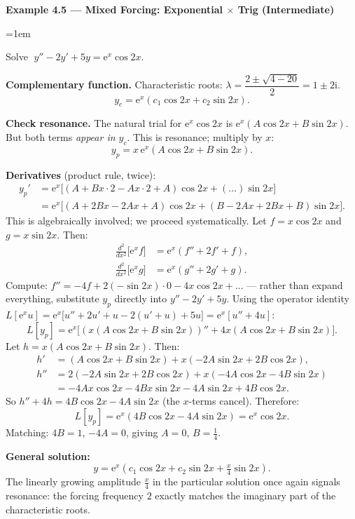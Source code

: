 \documentclass[12pt,a4paper]{article}
\newenvironment{example}[1]{%
  \vspace{0.8em}
  \noindent{\footnotesize\scshape\color{orange!50!black} Example}\par
  \noindent\textbf{#1}\par\vspace{0.3em}
  \begin{list}{}{\leftmargin=1em\rightmargin=0pt}\item
}{%
  \end{list}\vspace{0.8em}
}
\newcommand{\ee}{\mathrm{e}}
\newcommand{\ii}{\mathrm{i}}
\begin{document}
\begin{example}{Example 4.5 --- Mixed Forcing: Exponential $\times$ Trig (Intermediate)}
Solve $\;y'' - 2y' + 5y = \ee^x\cos 2x$.

\medskip
\textbf{Complementary function.}
Characteristic roots: $\lambda = \dfrac{2\pm\sqrt{4-20}}{2} = 1 \pm 2\ii$.
\[
  y_c = \ee^x(c_1\cos 2x + c_2\sin 2x).
\]

\textbf{Check resonance.} The natural trial for $\ee^x\cos 2x$ is
$\ee^x(A\cos 2x + B\sin 2x)$. But both terms \emph{appear in $y_c$}. This is
resonance; multiply by $x$:
\[
  y_p = x\,\ee^x(A\cos 2x + B\sin 2x).
\]

\textbf{Derivatives} (product rule, twice):
\begin{align*}
  y_p' &= \ee^x\bigl[(A+Bx\cdot 2 - Ax\cdot 2 + A)\cos 2x
          + (\ldots)\sin 2x\bigr]\\
  &= \ee^x\bigl[(A+2Bx-2Ax+A)\cos 2x + (B-2Ax+2Bx+B)\sin 2x\bigr].
\end{align*}
This is algebraically involved; we proceed systematically. Let
$f = x\cos 2x$ and $g = x\sin 2x$. Then:
\begin{align*}
  \frac{d^2}{dx^2}\bigl[\ee^x f\bigr]
  &= \ee^x(f'' + 2f' + f),\\
  \frac{d^2}{dx^2}\bigl[\ee^x g\bigr]
  &= \ee^x(g'' + 2g' + g).
\end{align*}
Compute: $f'' = -4f + 2(-\sin 2x) \cdot 0 - 4x\cos 2x + \ldots$ --- rather than
expand everything, substitute $y_p$ directly into $y'' - 2y' + 5y$. Using the
operator identity $L[\ee^x u] = \ee^x\bigl[u'' + 2u' + u - 2(u'+u) + 5u\bigr]
= \ee^x[u'' + 4u]$:
\[
  L[y_p] = \ee^x\bigl[(x(A\cos 2x + B\sin 2x))'' + 4x(A\cos 2x+B\sin 2x)\bigr].
\]
Let $h = x(A\cos 2x + B\sin 2x)$. Then:
\begin{align*}
  h' &= (A\cos 2x+B\sin 2x) + x(-2A\sin 2x+2B\cos 2x),\\
  h'' &= 2(-2A\sin 2x+2B\cos 2x) + x(-4A\cos 2x-4B\sin 2x)\\
      &= -4Ax\cos 2x - 4Bx\sin 2x - 4A\sin 2x + 4B\cos 2x.
\end{align*}
So $h'' + 4h = 4B\cos 2x - 4A\sin 2x$ (the $x$-terms cancel). Therefore:
\[
  L[y_p] = \ee^x(4B\cos 2x - 4A\sin 2x) = \ee^x\cos 2x.
\]
Matching: $4B = 1$, $-4A = 0$, giving $A = 0$, $B = \tfrac{1}{4}$.

\textbf{General solution:}
\[
  \boxed{y = \ee^x\!\left(c_1\cos 2x + c_2\sin 2x + \tfrac{x}{4}\sin 2x\right).}
\]
The linearly growing amplitude $\frac{x}{4}$ in the particular solution once again
signals resonance: the forcing frequency $2$ exactly matches the imaginary part of
the characteristic roots.
\end{example}
\end{document}

